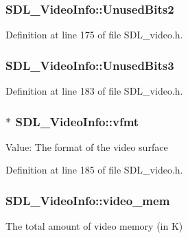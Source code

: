 \subsubsection[{Unused\+Bits2}]{ S\+D\+L\+\_\+\+Video\+Info\+::\+Unused\+Bits2}\label{struct_s_d_l___video_info_add1b831a063c0a4aed3f2f496096374b}


Definition at line 175 of file S\+D\+L\+\_\+video.\+h.

\hypertarget{struct_s_d_l___video_info_a647dc6f87a620ac1f4d7075a0f7063c7}{}
\subsubsection[{Unused\+Bits3}]{ S\+D\+L\+\_\+\+Video\+Info\+::\+Unused\+Bits3}\label{struct_s_d_l___video_info_a647dc6f87a620ac1f4d7075a0f7063c7}


Definition at line 183 of file S\+D\+L\+\_\+video.\+h.

\hypertarget{struct_s_d_l___video_info_a8501500d288bda9c60d8251138478f08}{}
\subsubsection[{vfmt}]{$\ast$ S\+D\+L\+\_\+\+Video\+Info\+::vfmt}\label{struct_s_d_l___video_info_a8501500d288bda9c60d8251138478f08}
Value\+: The format of the video surface 

Definition at line 185 of file S\+D\+L\+\_\+video.\+h.

\hypertarget{struct_s_d_l___video_info_ab706d6c856b170f8da28786e98fb5de3}{}
\subsubsection[{video\+\_\+mem}]{ S\+D\+L\+\_\+\+Video\+Info\+::video\+\_\+mem}\label{struct_s_d_l___video_info_ab706d6c856b170f8da28786e98fb5de3}
The total amount of video memory (in K) 


